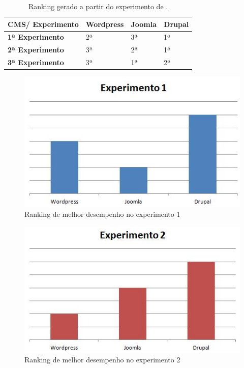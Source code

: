 \clearpage 

 \begin{table}[ht]
\begin{center}
\caption{Ranking gerado a partir do experimento de .}
 \label{tabela_patelc}
\begin{tabular}{|l|l|l|l|}\hline
CMS/ Experimento & \textbf{Wordpress} & \textbf{Joomla} & \textbf{Drupal}\\\hline
\textbf{1ª Experimento} & 2ª & 3ª & 1ª\\\hline
\textbf{2ª Experimento} & 3ª & 2ª & 1ª\\\hline
\textbf{3ª Experimento} & 3ª & 1ª & 2ª\\\hline
 \end{tabular}
 \end{center}
  \end{table}
  
\begin{figure}[!ht]
\centering
\includegraphics[keepaspectratio=true,scale=0.7]{figuras/exp001.JPG}
\caption{Ranking de melhor desempenho no experimento 1}
\label{Rank1}
\end{figure}  

\begin{figure}[!ht]
\centering
\includegraphics[keepaspectratio=true,scale=0.7]{figuras/exp002.JPG}
\caption{Ranking de melhor desempenho no experimento 2}
\label{Rank2}
\end{figure} 

